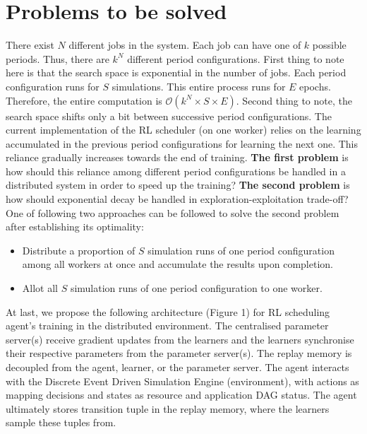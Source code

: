 \documentclass[10pt,a4paper]{article}
\begin{document}
\section{Problems to be solved}
\begin{normalsize}
There exist \(N\) different jobs in the system. Each job can have one of \(k\) possible periods. Thus, there are \(k^N\) different period configurations. First thing to note here is that the search space is exponential in the number of jobs. Each period configuration runs for \(S\) simulations. This entire process runs for \(E\) epochs. Therefore, the entire computation is $\mathcal{O}(k^N \times S  \times E)$. Second thing to note, the search space shifts only a bit between successive period configurations. The current implementation of the RL scheduler (on one worker) relies on the learning accumulated in the previous period configurations for learning the next one. This reliance gradually increases towards the end of training. \textbf{The first problem} is how should this reliance among different period configurations be handled in a distributed system in order to speed up the training? \textbf{The second problem} is how should exponential decay be handled in exploration-exploitation trade-off? One of following two approaches can be followed to solve the second problem after establishing its optimality:
\begin{itemize}
    \item Distribute a proportion of \(S\) simulation runs of one period configuration among all workers at once and accumulate the results upon completion.
    \item Allot all \(S\) simulation runs of one period configuration to one worker. 
\end{itemize}
At last, we propose the following architecture (Figure 1) for RL scheduling agent's training in the distributed environment. The centralised parameter server(s) receive gradient updates from the learners and the learners synchronise their respective parameters from the parameter server(s). The replay memory is decoupled from the agent, learner, or the parameter server. The agent interacts with the Discrete Event Driven Simulation Engine (environment), with actions as mapping decisions and states as resource and application DAG status. The agent ultimately stores transition tuple in the replay memory, where the learners sample these tuples from.
\end{normalsize}





\end{document}
